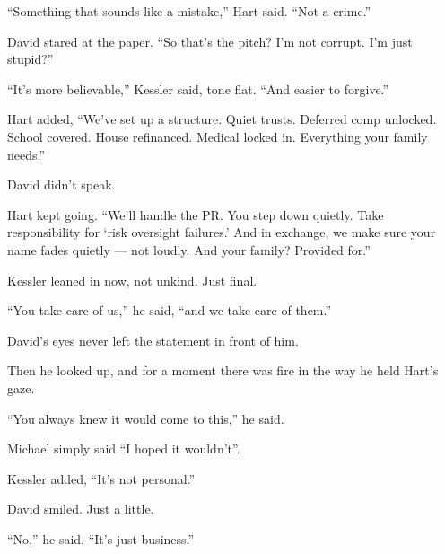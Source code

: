 “Something that sounds like a mistake,” Hart said. “Not a crime.”

David stared at the paper. “So that’s the pitch? I’m not corrupt. I'm just stupid?”

“It’s more believable,” Kessler said, tone flat. “And easier to forgive.”

Hart added, “We’ve set up a structure. Quiet trusts. Deferred comp unlocked. School covered. 
House refinanced. Medical locked in. Everything your family needs.”

David didn’t speak.

Hart kept going. “We’ll handle the PR. You step down quietly. Take responsibility for ‘risk 
oversight failures.’ And in exchange, we make sure your name fades quietly — not loudly. 
And your family? Provided for.”

Kessler leaned in now, not unkind. Just final.

“You take care of us,” he said, “and we take care of them.”

David’s eyes never left the statement in front of him.

Then he looked up, and for a moment there was fire in the way he held Hart’s gaze.

“You always knew it would come to this,” he said.

Michael simply said ``I hoped it wouldn't''.

Kessler added, ``It’s not personal.''

David smiled. Just a little.

``No,'' he said. ``It’s just business.''

